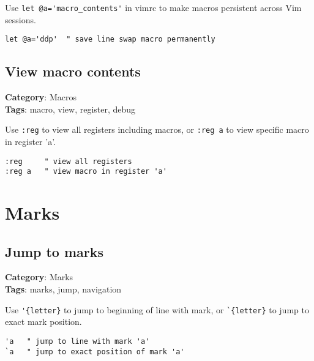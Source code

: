 {{{{{{{Use {\footnotesize \Verb§let @a='macro_contents'§} in vimrc to make macros persistent across Vim sessions.

\begin{Exa*}{}
\begin{Verbatim}[fontsize=\footnotesize, breaklines, breakanywhere]
let @a='ddp'  " save line swap macro permanently
\end{Verbatim}
\end{Exa*}

\section{View macro contents}

\textbf{Category}: Macros\\ \textbf{Tags}: macro, view, register, debug
\vspace{0.5cm}

Use {\footnotesize \Verb§:reg§} to view all registers including macros, or {\footnotesize \Verb§:reg a§} to view specific macro in register 'a'.

\begin{Exa*}{}
\begin{Verbatim}[fontsize=\footnotesize, breaklines, breakanywhere]
:reg     " view all registers
:reg a   " view macro in register 'a'
\end{Verbatim}
\end{Exa*}

\chapter{Marks}
\section{Jump to marks}

\textbf{Category}: Marks\\ \textbf{Tags}: marks, jump, navigation
\vspace{0.5cm}

Use {\footnotesize \Verb§'{letter}§} to jump to beginning of line with mark, or {\footnotesize \Verb§`{letter}§} to jump to exact mark position.

\begin{Exa*}{}
\begin{Verbatim}[fontsize=\footnotesize, breaklines, breakanywhere]
'a   " jump to line with mark 'a'
`a   " jump to exact position of mark 'a'
\end{Verbatim}
\end{Exa*}

}}}}}}}
